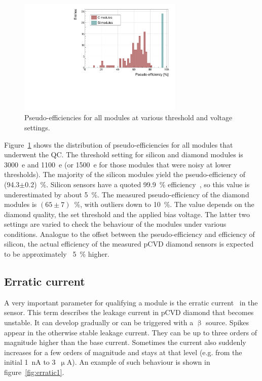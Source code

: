 \begin{figure}[!t]
\centering
\includegraphics[width=0.7\textwidth]{../scripts/04_charge_monitoring/plots/pseudoefficiency1} 
\caption{Pseudo-efficiencies for all modules at various threshold and voltage settings.}
\label{fig:pseudoeff}
\end{figure}

Figure~\ref{fig:pseudoeff} shows the distribution of pseudo-efficiencies for all modules that underwent the QC. The threshold setting for silicon and diamond modules is 3000~e and 1100~e (or 1500~e for those modules that were noisy at lower thresholds). The majority of the silicon modules yield the pseudo-efficiency of (94.3$\pm$0.2)~\%. Silicon sensors have a quoted 99.9~\% efficiency~\cite{1748-0221-7-11-P11010}, so this value is underestimated by about 5~\%. The measured pseudo-efficiency of the diamond modules is $(65\pm7)$~\%, with outliers down to 10~\%. The value depends on the diamond quality, the set threshold and the applied bias voltage. The latter two settings are varied to check the behaviour of the modules under various conditions. Analogue to the offset between the pseudo-efficiency and efficiency of silicon, the actual efficiency of the measured pCVD diamond sensors is expected to be approximately ~5~\% higher.

\subsection{Erratic current}
A very important parameter for qualifying a module is the erratic current~\cite{Mueller:1175553} in the sensor. This term describes the leakage current in pCVD diamond that becomes unstable. It can develop gradually or can be triggered with a $\upbeta$ source. Spikes appear in the otherwise stable leakage current. They can be up to three orders of magnitude higher than the base current. Sometimes the current also suddenly increases for a few orders of magnitude and stays at that level (e.g. from the initial 1~nA to 3~$\upmu$A). An example of such behaviour is shown in figure~\ref{fig:erratic1}. 

